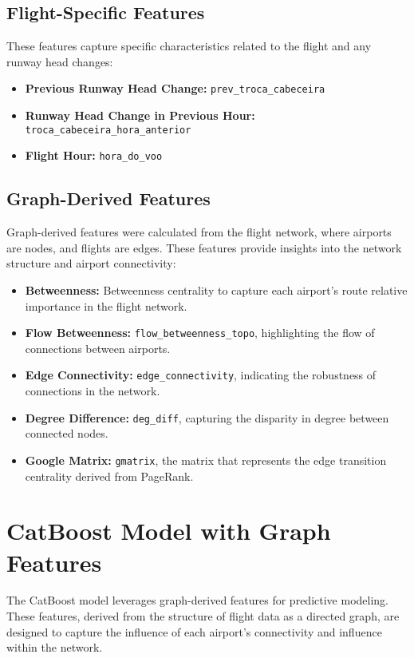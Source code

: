 \subsection{Flight-Specific Features}
These features capture specific characteristics related to the flight and any runway head changes:

\begin{itemize}
    \item \textbf{Previous Runway Head Change:} \texttt{prev\_troca\_cabeceira}
    \item \textbf{Runway Head Change in Previous Hour:} \texttt{troca\_cabeceira\_hora\_anterior}
    \item \textbf{Flight Hour:} \texttt{hora\_do\_voo}
\end{itemize}

\subsection{Graph-Derived Features}
Graph-derived features were calculated from the flight network, where airports are nodes, and flights are edges. These features provide insights into the network structure and airport connectivity:

\begin{itemize}
    \item \textbf{Betweenness:} Betweenness centrality to capture each airport's route relative importance in the flight network.
    \item \textbf{Flow Betweenness:} \texttt{flow\_betweenness\_topo}, highlighting the flow of connections between airports.
    \item \textbf{Edge Connectivity:} \texttt{edge\_connectivity}, indicating the robustness of connections in the network.
    \item \textbf{Degree Difference:} \texttt{deg\_diff}, capturing the disparity in degree between connected nodes.
    \item \textbf{Google Matrix:} \texttt{gmatrix}, the matrix that represents the edge transition centrality derived from PageRank.
\end{itemize}

\section{CatBoost Model with Graph Features}
The CatBoost model leverages graph-derived features for predictive modeling. These features, derived from the structure of flight data as a directed graph, are designed to capture the influence of each airport's connectivity and influence within the network.

